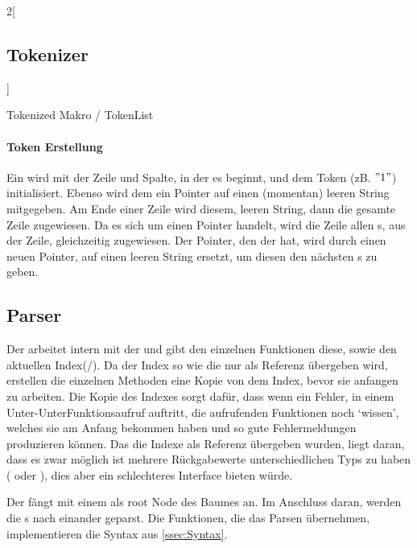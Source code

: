 {\begin{paracol}{2}[\subsection{Tokenizer}]
    \switchcolumn
      \begin{myCodeEnv}
        \begin{myInvBox}[width=.9\linewidth]
          
        \caption{Tokenized Makro / TokenList}
        \label{fig:extok}
        \end{myInvBox}
      \end{myCodeEnv}
  \end{paracol}

  \paragraph{Token Erstellung}
    Ein  wird mit der Zeile und Spalte, in der es beginnt, und dem Token (zB. \myMIn$"1 "$) initialisiert. Ebenso wird dem  ein Pointer auf einen (momentan) leeren String mitgegeben. Am Ende einer Zeile wird diesem, leeren String, dann die gesamte Zeile zugewiesen. Da es sich um einen Pointer handelt, wird die Zeile allen s, aus der Zeile, gleichzeitig zugewiesen. Der Pointer, den der  hat, wird durch einen neuen Pointer, auf einen leeren String ersetzt, um diesen den nächsten s zu geben.

  \subsection{Parser}
  \label{ssec:Parser}
    Der  arbeitet intern mit der  und gibt den einzelnen Funktionen diese, sowie den aktuellen Index(/). Da der Index so wie die  nur als Referenz übergeben wird, erstellen die einzelnen Methoden eine Kopie von dem Index, bevor sie anfangen zu arbeiten. Die Kopie des Indexes sorgt dafür, dass wenn ein Fehler, in einem Unter-UnterFunktionsaufruf auftritt, die aufrufenden Funktionen noch `wissen', welches  sie am Anfang bekommen haben und so gute Fehlermeldungen produzieren können. Das die Indexe als Referenz übergeben wurden, liegt daran, dass es zwar möglich ist mehrere Rückgabewerte unterschiedlichen Typs zu haben ( oder ), dies aber ein schlechteres Interface bieten würde.

    Der  fängt mit einem  als root Node des Baumes an. Im Anschluss daran, werden die s nach einander geparst. Die Funktionen, die das Parsen übernehmen, implementieren die Syntax aus \autoref{ssec:Syntax}.

}
